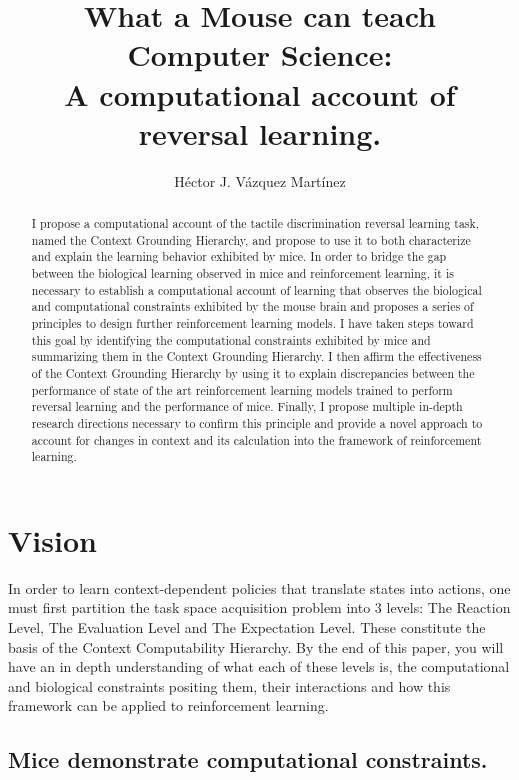 \documentclass[]{article}
\title{What a Mouse can teach Computer Science: \\
	A computational account of reversal learning.}
\author{H\'ector J. V\'azquez Mart\'inez}
\begin{document}
\maketitle

\begin{abstract}
I propose a computational account of the tactile discrimination reversal learning task, named the Context Grounding Hierarchy, and propose to use it to both characterize and explain the learning behavior exhibited by mice.
In order to bridge the gap between the biological learning observed in mice and reinforcement learning, it is necessary to establish a computational account of learning that observes the biological and computational constraints exhibited by the mouse brain and proposes a series of principles to design further reinforcement learning models.
I have taken steps toward this goal by identifying the computational constraints exhibited by mice and summarizing them in the Context Grounding Hierarchy.  I then affirm the effectiveness of the Context Grounding Hierarchy by using it to explain discrepancies between the performance of state of the art reinforcement learning models trained to perform reversal learning and the performance of mice.  Finally, I propose multiple in-depth research directions necessary to confirm this principle and provide a novel approach to account for changes in context and its  calculation into the framework of reinforcement learning.
\end{abstract}


\section{Vision}
In order to learn context-dependent policies that translate states into actions, one must first partition the task space acquisition problem into 3 levels: The Reaction Level, The Evaluation Level and The Expectation Level.  These constitute the basis of the Context Computability Hierarchy.  By the end of this paper, you will have an in depth understanding of what each of these levels is, the computational and biological constraints positing them, their interactions and how this framework can be applied to reinforcement learning.

\subsection{Mice demonstrate computational constraints.}
\end{document}
